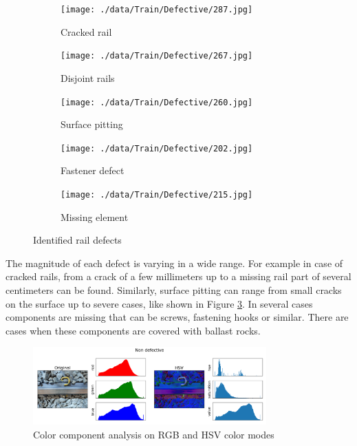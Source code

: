 \documentclass[10pt, final]{article}
\begin{document}
\begin{figure}[!ht]
	\centering
	\begin{subfigure}{0.3\textwidth}
		\centering
		\texttt{[image: ./data/Train/Defective/287.jpg]}
		\caption{Cracked rail}
		\label{fig:def_cracked}
	\end{subfigure}
	\begin{subfigure}{0.3\textwidth}
		\centering
		\texttt{[image: ./data/Train/Defective/267.jpg]}
		\caption{Disjoint rails}
		\label{fig:def_disjoint}
	\end{subfigure}
	\begin{subfigure}{0.3\textwidth}
		\centering
		\texttt{[image: ./data/Train/Defective/260.jpg]}
		\caption{Surface pitting}
		\label{fig:def_pitting}
	\end{subfigure}
	\begin{subfigure}{0.3\textwidth}
		\centering
		\texttt{[image: ./data/Train/Defective/202.jpg]}
		\caption{Fastener defect}
		\label{fig:def_nofix}
	\end{subfigure}
	\begin{subfigure}{0.3\textwidth}
		\centering
		\texttt{[image: ./data/Train/Defective/215.jpg]}
		\caption{Missing element}
		\label{fig:def_missing}
	\end{subfigure}
	\caption{Identified rail defects}
	\label{fig:rail_defects_all}
\end{figure}

The magnitude of each defect is varying in a wide range.
For example in case of cracked rails, from a crack of a few millimeters up to a missing rail part of several
centimeters can be found.
Similarly, surface pitting can range from small cracks on the surface up to severe cases, like shown in
Figure \ref{fig:def_pitting}.
In several cases components are missing that can be screws, fastening hooks or similar.
There are cases when these components are covered with ballast rocks.

\begin{figure}[!ht]
	\centering
	\includegraphics[width=0.8\textwidth]{./tex_graphs/comp_analysis_1.png}
	\caption{Color component analysis on RGB and HSV color modes}
	\label{fig:color_analysis}
\end{figure}
\end{document}
